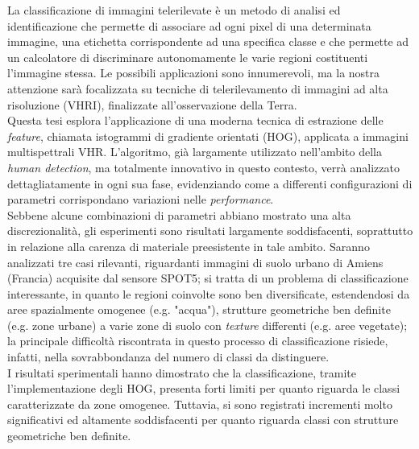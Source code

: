 
\italiano
\sommario
{}
La classificazione di immagini telerilevate è un metodo di analisi ed identificazione che permette di associare ad ogni pixel di una determinata immagine, una etichetta corrispondente ad una specifica classe e che permette ad un calcolatore di discriminare autonomamente le varie regioni costituenti l'immagine stessa. 
Le possibili applicazioni sono innumerevoli, ma la nostra attenzione sarà focalizzata su tecniche di telerilevamento di immagini ad alta risoluzione (VHRI), finalizzate all'osservazione della Terra. 
\\
Questa tesi esplora l'applicazione di una moderna tecnica di estrazione delle \emph{feature}, chiamata istogrammi di gradiente orientati (HOG), applicata a immagini multispettrali VHR.   
L'algoritmo, già largamente utilizzato nell'ambito della \emph{human detection}, ma totalmente innovativo in questo contesto, verrà analizzato dettagliatamente in ogni sua fase, evidenziando come a differenti configurazioni di parametri corrispondano variazioni nelle \emph{performance}. 
\\
Sebbene alcune combinazioni di parametri abbiano mostrato una alta discrezionalità, gli esperimenti sono risultati largamente soddisfacenti, soprattutto in relazione alla carenza di materiale preesistente in tale ambito.
Saranno analizzati tre casi rilevanti, riguardanti immagini di suolo urbano di Amiens (Francia) acquisite dal sensore SPOT5; si tratta di un problema di classificazione interessante, in quanto le regioni coinvolte sono ben diversificate, estendendosi da aree spazialmente omogenee (e.g. "acqua"), strutture geometriche ben definite (e.g. zone urbane) a varie zone di suolo con \emph{texture} differenti (e.g. aree vegetate); la principale difficoltà riscontrata in questo processo di classificazione risiede, infatti, nella sovrabbondanza del numero di classi da distinguere.
\\
I risultati sperimentali hanno dimostrato che la classificazione, tramite l'implementazione degli HOG, presenta forti limiti per quanto riguarda le classi caratterizzate da zone omogenee. Tuttavia, si sono registrati incrementi molto significativi ed altamente soddisfacenti per quanto riguarda classi con strutture geometriche ben definite.  


